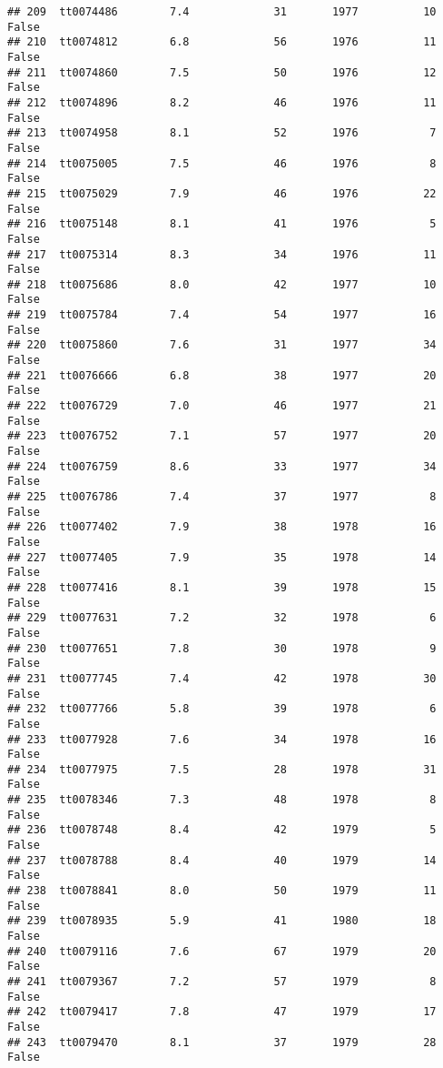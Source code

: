 \documentclass[
]{article}
\begin{document}
\begin{verbatim}
## 209  tt0074486        7.4             31       1977          10   False
## 210  tt0074812        6.8             56       1976          11   False
## 211  tt0074860        7.5             50       1976          12   False
## 212  tt0074896        8.2             46       1976          11   False
## 213  tt0074958        8.1             52       1976           7   False
## 214  tt0075005        7.5             46       1976           8   False
## 215  tt0075029        7.9             46       1976          22   False
## 216  tt0075148        8.1             41       1976           5   False
## 217  tt0075314        8.3             34       1976          11   False
## 218  tt0075686        8.0             42       1977          10   False
## 219  tt0075784        7.4             54       1977          16   False
## 220  tt0075860        7.6             31       1977          34   False
## 221  tt0076666        6.8             38       1977          20   False
## 222  tt0076729        7.0             46       1977          21   False
## 223  tt0076752        7.1             57       1977          20   False
## 224  tt0076759        8.6             33       1977          34   False
## 225  tt0076786        7.4             37       1977           8   False
## 226  tt0077402        7.9             38       1978          16   False
## 227  tt0077405        7.9             35       1978          14   False
## 228  tt0077416        8.1             39       1978          15   False
## 229  tt0077631        7.2             32       1978           6   False
## 230  tt0077651        7.8             30       1978           9   False
## 231  tt0077745        7.4             42       1978          30   False
## 232  tt0077766        5.8             39       1978           6   False
## 233  tt0077928        7.6             34       1978          16   False
## 234  tt0077975        7.5             28       1978          31   False
## 235  tt0078346        7.3             48       1978           8   False
## 236  tt0078748        8.4             42       1979           5   False
## 237  tt0078788        8.4             40       1979          14   False
## 238  tt0078841        8.0             50       1979          11   False
## 239  tt0078935        5.9             41       1980          18   False
## 240  tt0079116        7.6             67       1979          20   False
## 241  tt0079367        7.2             57       1979           8   False
## 242  tt0079417        7.8             47       1979          17   False
## 243  tt0079470        8.1             37       1979          28   False

\end{verbatim}
\end{document}
